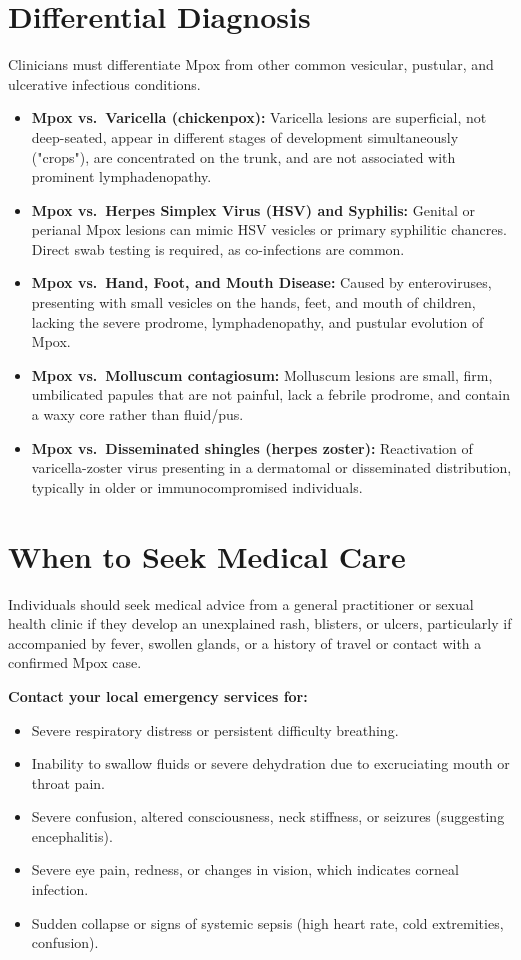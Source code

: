 \section*{Differential Diagnosis}
Clinicians must differentiate Mpox from other common vesicular, pustular, and ulcerative infectious conditions.
\begin{itemize}
    \item \textbf{Mpox vs.\ Varicella (chickenpox):} Varicella lesions are superficial, not deep-seated, appear in different stages of development simultaneously ("crops"), are concentrated on the trunk, and are not associated with prominent lymphadenopathy.
    \item \textbf{Mpox vs.\ Herpes Simplex Virus (HSV) and Syphilis:} Genital or perianal Mpox lesions can mimic HSV vesicles or primary syphilitic chancres. Direct swab testing is required, as co-infections are common.
    \item \textbf{Mpox vs.\ Hand, Foot, and Mouth Disease:} Caused by enteroviruses, presenting with small vesicles on the hands, feet, and mouth of children, lacking the severe prodrome, lymphadenopathy, and pustular evolution of Mpox.
    \item \textbf{Mpox vs.\ Molluscum contagiosum:} Molluscum lesions are small, firm, umbilicated papules that are not painful, lack a febrile prodrome, and contain a waxy core rather than fluid/pus.
    \item \textbf{Mpox vs.\ Disseminated shingles (herpes zoster):} Reactivation of varicella-zoster virus presenting in a dermatomal or disseminated distribution, typically in older or immunocompromised individuals.
\end{itemize}

\section*{When to Seek Medical Care}
Individuals should seek medical advice from a general practitioner or sexual health clinic if they develop an unexplained rash, blisters, or ulcers, particularly if accompanied by fever, swollen glands, or a history of travel or contact with a confirmed Mpox case.

\textbf{Contact your local emergency services for:}
\begin{itemize}
    \item Severe respiratory distress or persistent difficulty breathing.
    \item Inability to swallow fluids or severe dehydration due to excruciating mouth or throat pain.
    \item Severe confusion, altered consciousness, neck stiffness, or seizures (suggesting encephalitis).
    \item Severe eye pain, redness, or changes in vision, which indicates corneal infection.
    \item Sudden collapse or signs of systemic sepsis (high heart rate, cold extremities, confusion).
\end{itemize}

